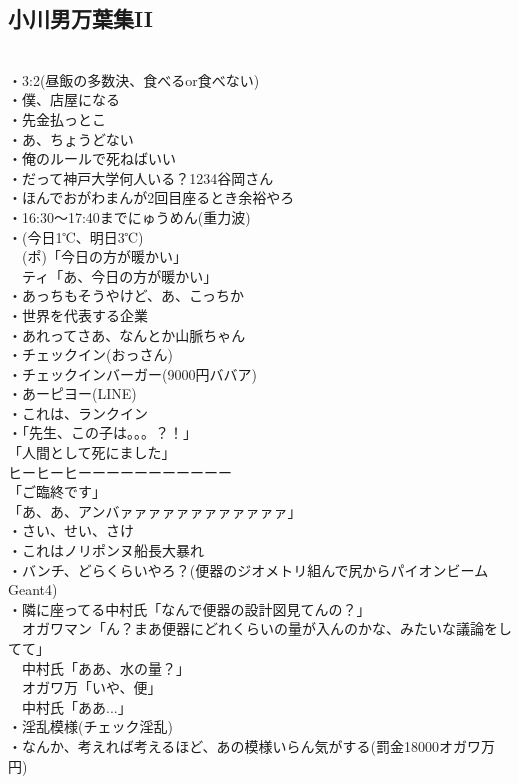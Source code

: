\subsection{小川男万葉集II}
　\\
・3:2(昼飯の多数決、食べるor食べない)\\
・僕、店屋になる\\
・先金払っとこ\\
・あ、ちょうどない\\
・俺のルールで死ねばいい\\
・だって神戸大学何人いる？1234谷岡さん\\
・ほんでおがわまんが2回目座るとき余裕やろ\\
・16:30〜17:40までにゅうめん(重力波)\\
・(今日1℃、明日3℃)\\
　(ポ)「今日の方が暖かい」\\
　ティ「あ、今日の方が暖かい」\\
・あっちもそうやけど、あ、こっちか\\
・世界を代表する企業\\
・あれってさあ、なんとか山脈ちゃん\\
・チェックイン(おっさん)\\
・チェックインバーガー(9000円ババア)\\
・あーピヨー(LINE)\\
・これは、ランクイン\\
・「先生、この子は。。。？！」\\
 「人間として死にました」\\
 ヒーヒーヒーーーーーーーーーーー\\
 「ご臨終です」\\
 「あ、あ、アンバァァァァァァァァァァァァ」\\
・さい、せい、さけ\\
・これはノリポンヌ船長大暴れ\\
・バンチ、どらくらいやろ？(便器のジオメトリ組んで尻からパイオンビームGeant4)\\
・隣に座ってる中村氏「なんで便器の設計図見てんの？」\\
 　オガワマン「ん？まあ便器にどれくらいの量が入んのかな、みたいな議論をしてて」\\
 　中村氏「ああ、水の量？」\\
 　オガワ万「いや、便」\\
 　中村氏「ああ...」\\
・淫乱模様(チェック淫乱)\\
・なんか、考えれば考えるほど、あの模様いらん気がする(罰金18000オガワ万円)\\
